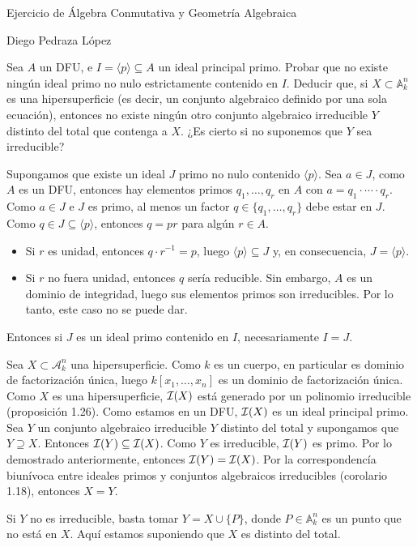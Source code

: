 \documentclass{article}
\begin{document}
\begin{center}
\large Ejercicio de Álgebra Conmutativa y Geometría Algebraica

\normalsize Diego Pedraza López
\end{center}

\begin{ejercicio}{8}
Sea $A$ un DFU, e $I = \langle p \rangle \subseteq A$ un ideal principal primo. Probar que no existe ningún ideal primo no nulo estrictamente contenido en $I$. Deducir que, si $X \subset \mathbb{A}_k^n$ es una hipersuperficie (es decir, un conjunto algebraico definido por una sola ecuación), entonces no existe ningún otro conjunto algebraico irreducible $Y$ distinto del total que contenga a $X$. ¿Es cierto si no suponemos que $Y$ sea irreducible?
\end{ejercicio}

\begin{sol}
Supongamos que existe un ideal $J$ primo no nulo contenido $\langle p \rangle$. Sea $a \in J$, como $A$ es un DFU, entonces hay elementos primos $q_1,\dots, q_r$ en $A$ con $a=q_1\cdot \cdots \cdot q_r$. Como $a \in J$ e $J$ es primo, al menos un factor $q \in \{q_1,\dots,q_r\}$ debe estar en $J$. Como $q \in J \subseteq \langle p\rangle$, entonces $q=pr$ para algún $r \in A$.
\begin{itemize}
	\item Si $r$ es unidad, entonces $q\cdot r^{-1} = p$, luego $\langle p \rangle \subseteq J$ y, en consecuencia, $J = \langle p \rangle$.
	\item Si $r$ no fuera unidad, entonces $q$ sería reducible. Sin embargo, $A$ es un dominio de integridad, luego sus elementos primos son irreducibles. Por lo tanto, este caso no se puede dar.
\end{itemize}
Entonces si $J$ es un ideal primo contenido en $I$, necesariamente $I = J$.

Sea $X \subset \mathcal{A}_k^n$ una hipersuperficie. Como $k$ es un cuerpo, en particular es dominio de factorización única, luego $k[x_1,\dots,x_n]$ es un dominio de factorización única. Como $X$ es una hipersuperficie, $\mathcal{I}(X)$ está generado por un polinomio irreducible (proposición 1.26). Como estamos en un DFU, $\mathcal{I}(X)$ es un ideal principal primo. Sea $Y$ un conjunto algebraico irreducible $Y$ distinto del total y supongamos que $Y \supseteq X$. Entonces $\mathcal{I}(Y) \subseteq \mathcal{I}(X)$. Como $Y$ es irreducible, $\mathcal{I}(Y)$ es primo. Por lo demostrado anteriormente, entonces $\mathcal{I}(Y) = \mathcal{I}(X)$. Por la correspondencía biunívoca entre ideales primos y conjuntos algebraicos irreducibles (corolario 1.18), entonces $X=Y$.

Si $Y$ no es irreducible, basta tomar $Y = X \cup \{P\}$, donde $P \in \mathbb{A}_k^n$ es un punto que no está en $X$. Aquí estamos suponiendo que $X$ es distinto del total.
\end{sol}
\end{document}
